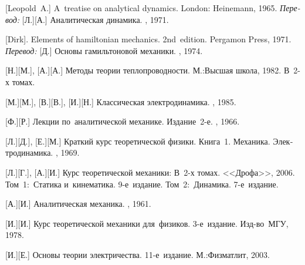 \begin{thebibliography}{123}
\begin{otherlanguage}{russian}
[Leopold~A.] A~treatise on analytical dynamics.
London: Heinemann, 1965. 
\emph{Перевод:} [Л.][А.] Аналитическая динамика. \naukapublisher, 1971. 

[Dirk]. Elements of hamiltonian mechanics. 2nd~edition. Pergamon Press, 1971. 
\emph{Перевод:} [Д.] Основы гамильтоновой механики. \naukapublisher, 1974. 

[Н.][М.], [А.][А.] Методы теории теплопроводности. М.:\;Высшая школа, 1982. В~2\hbox{-}х томах.

[М.][М.], [В.][В.], [И.][Н.] Классическая электродинамика. \naukapublisher, 1985. 

[Ф.][Р.] Лекции по~аналитической механике. Издание~2\hbox{-}е. \naukapublisher, 1966. 

[Л.][Д.], [Е.][М.] Краткий курс теоретической физики. Книга~1. Механика. Электродинамика. \naukapublisher, 1969. 

[Л.][Г.], [А.][И.] Курс теоретической механики: В~2\hbox{-}х томах. <<Дрофа>>, 2006.
Том~1:~Статика и~кинематика. 9\hbox{-}е~издание. 
Том~2:~Динамика. 7\hbox{-}е~издание. 

[А.][И.] Аналитическая механика. \fizmatgiz, 1961. 

[И.][И.] Курс теоретической механики для~физиков. 3\hbox{-}е~издание. Изд\hbox{-}во~МГУ, 1978. 

[И.][Е.] %
Основы теории электричества. 11\hbox{-}е~издание. М.:\;Физматлит, 2003.


\end{otherlanguage}
\end{thebibliography}
